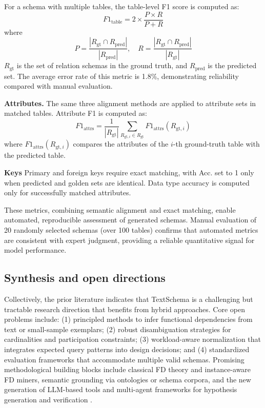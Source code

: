 For a schema with multiple tables, the table-level F1 score is computed as:
\begin{equation}
F1_{\text{table}} = 2 \times \frac{P \times R}{P + R}
\end{equation}
where
\begin{equation}
P = \frac{|R_{\text{gt}} \cap R_{\text{pred}}|}{|R_{\text{pred}}|}, \quad 
R = \frac{|R_{\text{gt}} \cap R_{\text{pred}}|}{|R_{\text{gt}}|}
\end{equation}
$R_{\text{gt}}$ is the set of relation schemas in the ground truth, and $R_{\text{pred}}$ is the predicted set. The average error rate of this metric is 1.8\%, demonstrating reliability compared with manual evaluation.

\textbf{Attributes.} The same three alignment methods are applied to attribute sets in matched tables. Attribute F1 is computed as:
\begin{equation}
F1_{\text{attrs}} = \frac{1}{|R_{\text{gt}}|} \sum_{R_{\text{gt},i} \in R_{\text{gt}}} F1_{\text{attrs}}(R_{\text{gt},i})
\end{equation}
where $F1_{\text{attrs}}(R_{\text{gt},i})$ compares the attributes of the $i$-th ground-truth table with the predicted table.

\textbf{Keys} Primary and foreign keys require exact matching, with Acc. set to 1 only when predicted and golden sets are identical. Data type accuracy is computed only for successfully matched attributes.

These metrics, combining semantic alignment and exact matching, enable automated, reproducible assessment of generated schemas. Manual evaluation of 20 randomly selected schemas (over 100 tables) confirms that automated metrics are consistent with expert judgment, providing a reliable quantitative signal for model performance.




\subsection{Synthesis and open directions}
\label{sec:open-directions}

Collectively, the prior literature indicates that Text\textrightarrow Schema is a challenging but tractable research direction that benefits from hybrid approaches. Core open problems include: (1) principled methods to infer functional dependencies from text or small-sample exemplars; (2) robust disambiguation strategies for cardinalities and participation constraints; (3) workload-aware normalization that integrates expected query patterns into design decisions; and (4) standardized evaluation frameworks that accommodate multiple valid schemas. Promising methodological building blocks include classical FD theory and instance-aware FD miners, semantic grounding via ontologies or schema corpora, and the new generation of LLM-based tools and multi-agent frameworks for hypothesis generation and verification \cite{bernstein1976,huhtala1999tane,navarro2009,parciak2024,schemaagent2025}.
